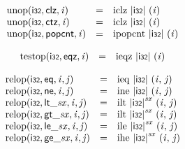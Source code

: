 $$
\begin{array}{@{}lcl@{}l@{}}
{\mathrm{unop}}(\mathsf{i{\scriptstyle32}}, \mathsf{clz}, {\mathit{i}}) &=& {\mathrm{iclz}}~{|\mathsf{i{\scriptstyle32}}|}~({\mathit{i}}) &  \\
{\mathrm{unop}}(\mathsf{i{\scriptstyle32}}, \mathsf{ctz}, {\mathit{i}}) &=& {\mathrm{iclz}}~{|\mathsf{i{\scriptstyle32}}|}~({\mathit{i}}) &  \\
{\mathrm{unop}}(\mathsf{i{\scriptstyle32}}, \mathsf{popcnt}, {\mathit{i}}) &=& {\mathrm{ipopcnt}}~{|\mathsf{i{\scriptstyle32}}|}~({\mathit{i}}) &  \\
\end{array}
$$

$$
\begin{array}{@{}lcl@{}l@{}}
{\mathrm{testop}}(\mathsf{i{\scriptstyle32}}, \mathsf{eqz}, {\mathit{i}}) &=& {\mathrm{ieqz}}~{|\mathsf{i{\scriptstyle32}}|}~({\mathit{i}}) &  \\
\end{array}
$$

$$
\begin{array}{@{}lcl@{}l@{}}
{\mathrm{relop}}(\mathsf{i{\scriptstyle32}}, \mathsf{eq}, {\mathit{i}}, {\mathit{j}}) &=& {\mathrm{ieq}}~{|\mathsf{i{\scriptstyle32}}|}~({\mathit{i}},\, {\mathit{j}}) &  \\
{\mathrm{relop}}(\mathsf{i{\scriptstyle32}}, \mathsf{ne}, {\mathit{i}}, {\mathit{j}}) &=& {\mathrm{ine}}~{|\mathsf{i{\scriptstyle32}}|}~({\mathit{i}},\, {\mathit{j}}) &  \\
{\mathrm{relop}}(\mathsf{i{\scriptstyle32}}, {\mathsf{lt\_}}{{\mathit{sx}}}, {\mathit{i}}, {\mathit{j}}) &=& {\mathrm{ilt}}~{{|\mathsf{i{\scriptstyle32}}|}^{{\mathit{sx}}}}~({\mathit{i}},\, {\mathit{j}}) &  \\
{\mathrm{relop}}(\mathsf{i{\scriptstyle32}}, {\mathsf{gt\_}}{{\mathit{sx}}}, {\mathit{i}}, {\mathit{j}}) &=& {\mathrm{ilt}}~{{|\mathsf{i{\scriptstyle32}}|}^{{\mathit{sx}}}}~({\mathit{i}},\, {\mathit{j}}) &  \\
{\mathrm{relop}}(\mathsf{i{\scriptstyle32}}, {\mathsf{le\_}}{{\mathit{sx}}}, {\mathit{i}}, {\mathit{j}}) &=& {\mathrm{ile}}~{{|\mathsf{i{\scriptstyle32}}|}^{{\mathit{sx}}}}~({\mathit{i}},\, {\mathit{j}}) &  \\
{\mathrm{relop}}(\mathsf{i{\scriptstyle32}}, {\mathsf{ge\_}}{{\mathit{sx}}}, {\mathit{i}}, {\mathit{j}}) &=& {\mathrm{ihe}}~{{|\mathsf{i{\scriptstyle32}}|}^{{\mathit{sx}}}}~({\mathit{i}},\, {\mathit{j}}) &  \\
\end{array}
$$


